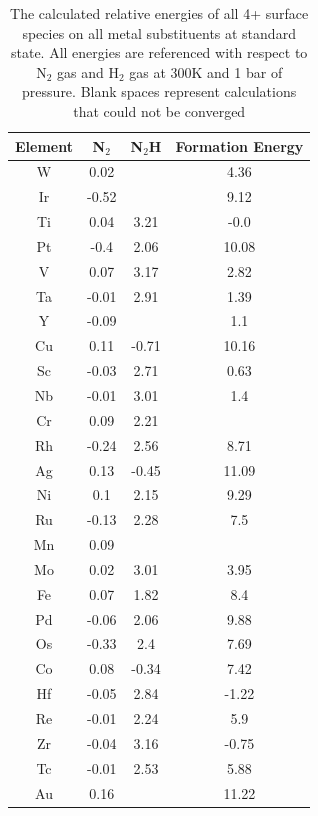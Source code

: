 \documentclass[journal=jacsat,manuscript=article]{achemso}
\begin{document}
\begin{table}
\begin{center}
\begin{tabular}{| c | c | c | c |}
\hline
Element & N$_2$ & N$_2$H & Formation Energy \\
\hline
W & 0.02 &  & 4.36 \\
Ir & -0.52 &  & 9.12 \\
Ti & 0.04 & 3.21 & -0.0 \\
Pt & -0.4 & 2.06 & 10.08 \\
V & 0.07 & 3.17 & 2.82 \\
Ta & -0.01 & 2.91 & 1.39 \\
Y & -0.09 &  & 1.1 \\
Cu & 0.11 & -0.71 & 10.16 \\
Sc & -0.03 & 2.71 & 0.63 \\
Nb & -0.01 & 3.01 & 1.4 \\
Cr & 0.09 & 2.21 &  \\
Rh & -0.24 & 2.56 & 8.71 \\
Ag & 0.13 & -0.45 & 11.09 \\
Ni & 0.1 & 2.15 & 9.29 \\
Ru & -0.13 & 2.28 & 7.5 \\
Mn & 0.09 &  &  \\
Mo & 0.02 & 3.01 & 3.95 \\
Fe & 0.07 & 1.82 & 8.4 \\
Pd & -0.06 & 2.06 & 9.88 \\
Os & -0.33 & 2.4 & 7.69 \\
Co & 0.08 & -0.34 & 7.42 \\
Hf & -0.05 & 2.84 & -1.22 \\
Re & -0.01 & 2.24 & 5.9 \\
Zr & -0.04 & 3.16 & -0.75 \\
Tc & -0.01 & 2.53 & 5.88 \\
Au & 0.16 &  & 11.22 \\
\hline
\end{tabular}
\end{center}
\label{table:4+_energies}
\caption{The calculated relative energies of all 4+ surface species on all metal substituents at standard state. All energies are referenced with respect to N$_2$ gas and H$_2$ gas at 300K and 1 bar of pressure. Blank spaces represent calculations that could not be converged}
\end{table}
\end{document}
